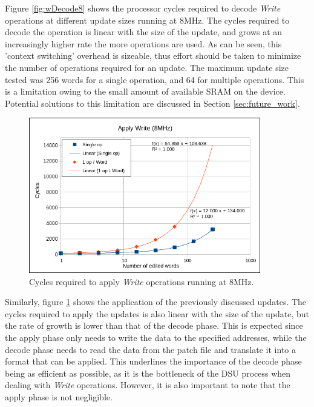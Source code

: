 Figure \ref{fig:wDecode8} shows the processor cycles required to decode \textit{Write} operations at different update sizes running at 8MHz. The cycles required to decode the operation is linear with the size of the update, and grows at an increasingly higher rate the more operations are used. As can be seen, this 'context switching' overhead is sizeable, thus effort should be taken to minimize the number of operations required for an update. The maximum update size tested was 256 words for a single operation, and 64 for multiple operations. This is a limitation owing to the small amount of available SRAM on the device. Potential solutions to this limitation are discussed in Section \ref{sec:future_work}. 

\begin{figure}[!ht]
    \centering
    \includegraphics[width=0.9\textwidth]{img/wApply8.png}
    \caption{Cycles required to apply \textit{Write} operations running at 8MHz.}
    \label{fig:wApply8}
\end{figure}
Similarly, figure \ref{fig:wApply8} shows the application of the previously discussed updates. The cycles required to apply the updates is also linear with the size of the update, but the rate of growth is lower than that of the decode phase. This is expected since the apply phase only needs to write the data to the specified addresses, while the decode phase needs to read the data from the patch file and translate it into a format that can be applied. This underlines the importance of the decode phase being as efficient as possible, as it is the bottleneck of the DSU process when dealing with \textit{Write} operations. However, it is also important to note that the apply phase is not negligible. 


